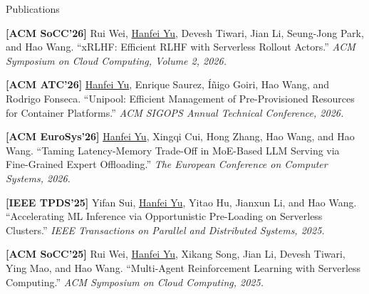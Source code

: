 \documentclass{resume} %
\begin{document}
\begin{rSection}{Publications}
\setlength{\parskip}{0.65\baselineskip}

\textbf{[ACM SoCC'26]} Rui Wei, \underline{Hanfei Yu}, Devesh Tiwari, Jian Li, Seung-Jong Park, and Hao Wang. ``xRLHF: Efficient RLHF with Serverless Rollout Actors.'' \textit{ACM Symposium on Cloud Computing, Volume 2, 2026.}

\textbf{[ACM ATC'26]} \underline{Hanfei Yu}, Enrique Saurez, \'{I}\~{n}igo Goiri, Hao Wang, and Rodrigo Fonseca. ``Unipool: Efficient Management of Pre-Provisioned Resources for Container Platforms.'' \textit{ACM SIGOPS Annual Technical Conference, 2026.}

\textbf{[ACM EuroSys'26]} \underline{Hanfei Yu}, Xingqi Cui, Hong Zhang, Hao Wang, and Hao Wang. ``Taming Latency-Memory Trade-Off in MoE-Based LLM Serving via Fine-Grained Expert Offloading.'' \textit{The European Conference on Computer Systems, 2026.}




\textbf{[IEEE TPDS'25]} Yifan Sui, \underline{Hanfei Yu}, Yitao Hu, Jianxun Li, and Hao Wang. ``Accelerating ML Inference via Opportunistic Pre-Loading on Serverless Clusters.'' \textit{IEEE Transactions on Parallel and Distributed Systems, 2025.}

\textbf{[ACM SoCC'25]} Rui Wei, \underline{Hanfei Yu}, Xikang Song, Jian Li, Devesh Tiwari, Ying Mao, and Hao Wang. ``Multi-Agent Reinforcement Learning with Serverless Computing.'' \textit{ACM Symposium on Cloud Computing, 2025.}



\end{rSection}
\end{document}
